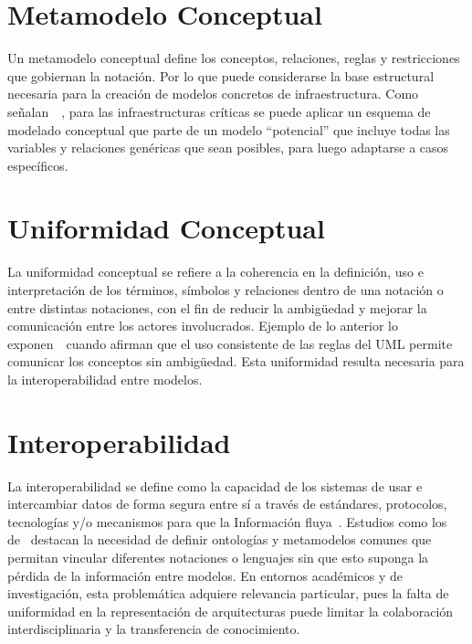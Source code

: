 \section{Metamodelo Conceptual}
\noindent
Un metamodelo conceptual define los conceptos, relaciones, reglas y restricciones que gobiernan la notación. Por lo que puede considerarse la base estructural necesaria para la creación de modelos concretos de infraestructura. Como señalan~\cite{Sokolowski01}~, para las infraestructuras críticas se puede aplicar un esquema de modelado conceptual que parte de un modelo ``potencial'' que incluye todas las variables y relaciones genéricas que sean posibles, para luego adaptarse a casos específicos.

\section{Uniformidad Conceptual}
La uniformidad conceptual se refiere a la coherencia en la definición, uso e interpretación de los términos, símbolos y relaciones dentro de una notación o entre distintas notaciones, con el fin de reducir la ambigüedad y mejorar la comunicación entre los actores involucrados. Ejemplo de lo anterior lo exponen~\cite{Booch01}~cuando afirman que el uso consistente de las reglas del UML permite comunicar los conceptos sin ambigüedad. Esta uniformidad resulta necesaria para la interoperabilidad entre modelos.

\section{Interoperabilidad}
\noindent
La interoperabilidad se define como la capacidad de los sistemas de usar e intercambiar datos de forma segura entre sí a través de estándares, protocolos, tecnologías y/o mecanismos para que la Información fluya~\citep{AWS01}. Estudios como los de~\cite{Bouzidi01} destacan la necesidad de definir ontologías y metamodelos comunes que permitan vincular diferentes notaciones o lenguajes sin que esto suponga la pérdida de la información entre modelos. En entornos académicos y de investigación, esta problemática adquiere relevancia particular, pues la falta de uniformidad en la representación de arquitecturas puede limitar la colaboración interdisciplinaria y la transferencia de conocimiento.